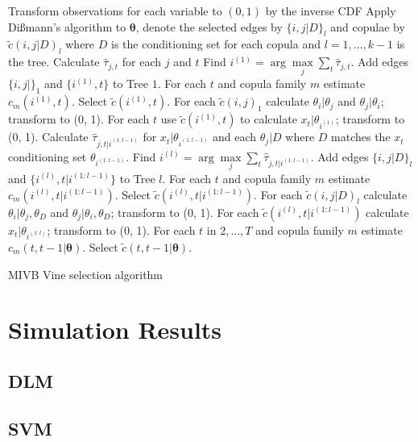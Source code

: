 \documentclass[12pt,a4paper]{article}%
\numberwithin{equation}{section}
\begin{document}
\begin{algorithm}[H]
 Transform observations for each variable to $(0, 1)$ by the inverse CDF\;
 Apply Di{\ss}mann's algorithm to $\boldsymbol{\theta}$, denote the selected edges by $\{i, j | D \}_l$ and copulae by $\tilde{c}(i, j | D)_l$ where $D$ is the conditioning set for each copula and $l = 1, \dots, k-1$ is the tree. \;
 Calculate $\hat{\tau}_{j, t}$ for each $j$ and $t$ \;
 Find $i^{(1)} = \arg \underset{j}{\max} \sum_t \hat{\tau}_{j, t}$. \;
 Add edges $\{i, j |\}_1$ and $\{i^{(1)}, t \}$ to Tree $1$. \;
 For each $t$ and copula family $m$ estimate $c_m(i^{(1)}, t)$.\;
 Select $\tilde{c}(i^{(1)}, t)$.\;
 For each $\tilde{c}(i, j)_1$ calculate $\theta_i | \theta_j$ and $\theta_j | \theta_i$; transform to (0, 1).\;
 For each $t$ use $\tilde{c}(i^{(1)}, t)$ to calculate $x_t | \theta_{i^{(1)}}$; transform to (0, 1).\;
  {
    Calculate $\hat{\tau}_{j, t | i^{(1:l-1)}}$ for $x_t | \theta_{i^{(1:l-1)}}$ and each $\theta_j | D$ where $D$ matches the $x_t$ conditioning set $\theta_{i^{(1:l-1)}}$. \;
  Find $i^{(l)} = \arg \underset{j}{\max} \sum_t \hat{\tau}_{j, t | i^{(1:l-1)}}$. \;
  Add edges $\{i, j | D\}_l$ and $\{i^{(l)}, t |  i^{(1:l-1)}\}$ to Tree $l$. \;
  For each $t$ and copula family $m$ estimate $c_m(i^{(l)}, t |i^{(1:l-1)})$.\;
  Select $\tilde{c}(i^{(l)}, t |i^{(1:l-1)})$.\;
  For each $\tilde{c}(i, j | D)_l$ calculate $\theta_i | \theta_j, \theta_D$ and $\theta_j | \theta_i, \theta_D$; transform to (0, 1).\;
  For each $\tilde{c}(i^{(l)}, t |i^{(1:l-1)})$ calculate $x_t | \theta_{i^{(1:l)}}$; transform to (0, 1).\;
 }
  For each $t$ in $2, \dots, T$ and copula family $m$ estimate $c_m(t, t-1 | \boldsymbol{\theta}).$ \;
  Select $\tilde{c}(t, t-1 | \boldsymbol{\theta})$. \;
   \caption{MIVB Vine selection algorithm}
  \label{alg:MIVB}
\end{algorithm}

\section{Simulation Results}
\subsection{DLM}
\subsection{SVM}
\end{document}

